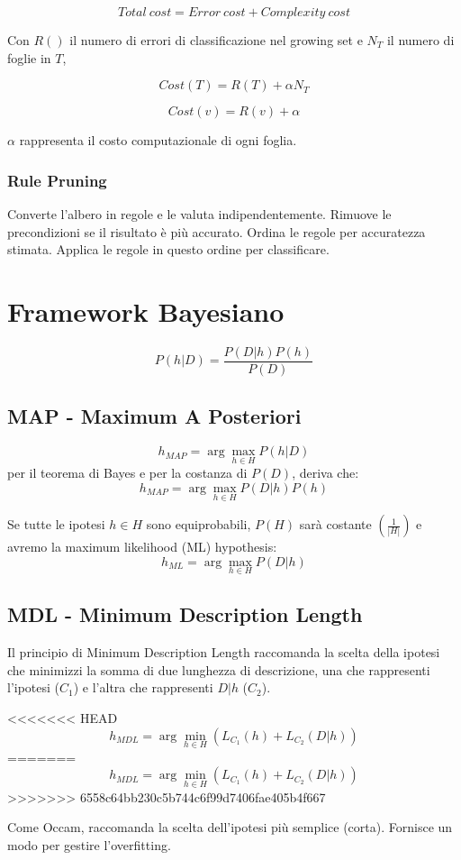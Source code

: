 \documentclass[11pt,onecolumn,a4paper,oneside]{book}
\begin{document}
$$Total~cost = Error~cost + Complexity~cost$$

Con $R()$ il numero di errori di classificazione nel growing set e $N_T$ il numero di foglie in $T$,

$$Cost(T) = R(T) + \alpha N_T$$

$$Cost(v) = R(v) + \alpha $$

$\alpha$ rappresenta il costo computazionale di ogni foglia.

\subsection{Rule Pruning}
Converte l'albero in regole e le valuta indipendentemente.
Rimuove le precondizioni se il risultato è più accurato.
Ordina le regole per accuratezza stimata. Applica le regole in questo ordine per classificare.


\chapter{Framework Bayesiano}

$$P(h|D)=\frac{P(D|h)P(h)}{P(D)}$$


\section{MAP - Maximum A Posteriori}
$$h_{MAP} = \arg\max_{h \in H} P(h|D)$$
per il teorema di Bayes e per la costanza di $P(D)$, deriva che:
$$h_{MAP} = \arg\max_{h \in H} P(D|h)P(h)$$

Se tutte le ipotesi $h \in H$ sono equiprobabili, $P(H)$ sarà costante $\left( \frac{1}{|H|} \right)$ e avremo la maximum likelihood (ML) hypothesis:
$$h_{ML} = \arg\max_{h\in H} P(D|h)$$


\section{MDL - Minimum Description Length}
Il principio di Minimum Description Length raccomanda la scelta della ipotesi che minimizzi la somma di due lunghezza di descrizione, una che rappresenti l'ipotesi ($C_1$) e l'altra che rappresenti $D|h$ ($C_2$).

<<<<<<< HEAD
$$h_{MDL} = \arg\min_{h\in H} \left( L_{C_{1}}(h) + L_{C_{2}}(D|h) \right)$$
=======
$$h_{MDL} = \arg\min_{h\in H} \left(L_{C_{1}}(h) + L_{C_{2}}(D|h)\right)$$
>>>>>>> 6558c64bb230c5b744c6f99d7406fae405b4f667

Come Occam, raccomanda la scelta dell'ipotesi più semplice (corta).
Fornisce un modo per gestire l'overfitting.
\end{document}
